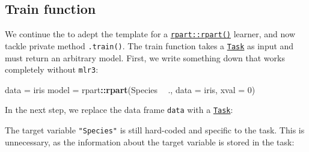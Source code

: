 \documentclass[]{scrbook}
\newenvironment{Shaded}{\begin{snugshade}}{\end{snugshade}}
\newcommand{\DataTypeTok}[1]{\textcolor[rgb]{0.13,0.29,0.53}{#1}}
\newcommand{\DecValTok}[1]{\textcolor[rgb]{0.00,0.00,0.81}{#1}}
\newcommand{\KeywordTok}[1]{\textcolor[rgb]{0.13,0.29,0.53}{\textbf{#1}}}
\newcommand{\NormalTok}[1]{#1}
\newcommand{\OperatorTok}[1]{\textcolor[rgb]{0.81,0.36,0.00}{\textbf{#1}}}
\newcommand{\StringTok}[1]{\textcolor[rgb]{0.31,0.60,0.02}{#1}}
\renewenvironment{Shaded} {\begin{snugshade}\small} {\end{snugshade}}
\begin{document}
\hypertarget{learner-train}{%
\subsection{Train function}\label{learner-train}}

We continue the to adept the template for a \href{https://www.rdocumentation.org/packages/rpart/topics/rpart}{\texttt{rpart::rpart()}} learner, and now tackle private method \texttt{.train()}.
The train function takes a \href{https://mlr3.mlr-org.com/reference/Task.html}{\texttt{Task}} as input and must return an arbitrary model.
First, we write something down that works completely without \texttt{mlr3}:

\begin{Shaded}
\begin{Highlighting}[]
\NormalTok{data =}\StringTok{ }\NormalTok{iris}
\NormalTok{model =}\StringTok{ }\NormalTok{rpart}\OperatorTok{::}\KeywordTok{rpart}\NormalTok{(Species }\OperatorTok{~}\StringTok{ }\NormalTok{., }\DataTypeTok{data =}\NormalTok{ iris, }\DataTypeTok{xval =} \DecValTok{0}\NormalTok{)}
\end{Highlighting}
\end{Shaded}

In the next step, we replace the data frame \texttt{data} with a \href{https://mlr3.mlr-org.com/reference/Task.html}{\texttt{Task}}:

\begin{Shaded}
\end{Shaded}

The target variable \texttt{"Species"} is still hard-coded and specific to the task.
This is unnecessary, as the information about the target variable is stored in the task:

\begin{Shaded}
\end{Shaded}
\end{document}
